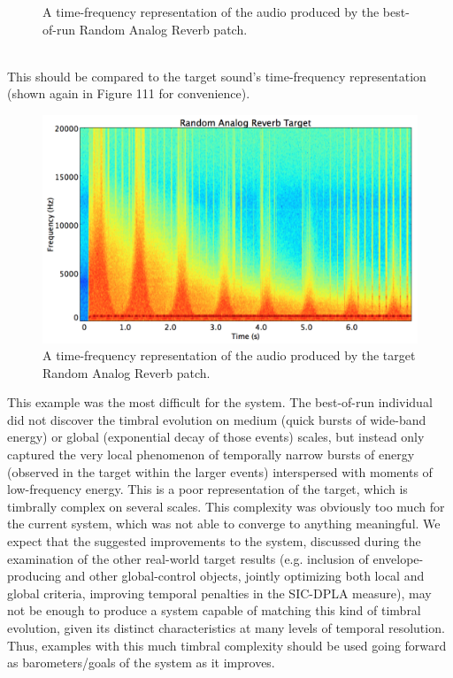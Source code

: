 \documentclass[12pt]{report} 	%
\numberwithin{figure}{chapter}
\numberwithin{table}{chapter}
\numberwithin{equation}{chapter}
\begin{document}
\begin{flushleft}
\begin{figure}[h!]
\begin{center}
\caption[Best-of-run random analog reverb time-frequency representation]{A time-frequency representation of the audio produced by the best-of-run Random Analog Reverb patch.}
\end{center}
\vspace{18pt}
\end{figure}
\\
This should be compared to the target sound's time-frequency representation (shown again in Figure 111 for convenience).
\begin{figure}[h!]
\begin{center}
\includegraphics[scale=0.32]{RandomAnalogReverbTargetSTFT}
\caption[Target random analog reverb time-frequency representation]{A time-frequency representation of the audio produced by the target Random Analog Reverb patch.}
\end{center}
\end{figure}
This example was the most difficult for the system. The best-of-run individual did not discover the timbral evolution on medium (quick bursts of wide-band energy) or global (exponential decay of those events) scales, but instead only captured the very local phenomenon of temporally narrow bursts of energy (observed in the target within the larger events) interspersed with moments of low-frequency energy. This is a poor representation of the target, which is timbrally complex on several scales. This complexity was obviously too much for the current system, which was not able to converge to anything meaningful. We expect that the suggested improvements to the system, discussed during the examination of the other real-world target results (e.g. inclusion of envelope-producing and other global-control objects, jointly optimizing both local and global criteria, improving temporal penalties in the SIC-DPLA measure), may not be enough to produce a system capable of matching this kind of timbral evolution, given its distinct characteristics at many levels of temporal resolution. Thus, examples with this much timbral complexity should be used going forward as barometers/goals of the system as it improves.


\end{flushleft}
\end{document}
